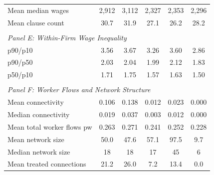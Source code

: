 \begin{table}[H]
\begin{threeparttable}
\begin{tabular}{lccccc}
Mean median wages & 2,912 & 3,112 & 2,327 & 2,353 & 2,296 \\
Mean clause count & 30.7 & 31.9 & 27.1 & 26.2 & 28.2 \\
&&&&& \\
\multicolumn{6}{l}{\textit{Panel E: Within-Firm Wage Inequality}} \\[0.5ex]
p90/p10 & 3.56 & 3.67 & 3.26 & 3.60 & 2.86 \\
p90/p50 & 2.03 & 2.04 & 1.99 & 2.12 & 1.83 \\
p50/p10 & 1.71 & 1.75 & 1.57 & 1.63 & 1.50 \\
&&&&& \\
\multicolumn{6}{l}{\textit{Panel F: Worker Flows and Network Structure}} \\[0.5ex]
Mean connectivity & 0.106 & 0.138 & 0.012 & 0.023 & 0.000 \\
Median connectivity & 0.019 & 0.037 & 0.003 & 0.012 & 0.000 \\
Mean total worker flows pw & 0.263 & 0.271 & 0.241 & 0.252 & 0.228 \\
Mean network size & 50.0 & 47.6 & 57.1 & 97.5 & 9.7 \\
Median network size & 18 & 18 & 17 & 45 & 6 \\
Mean treated connections & 21.2 & 26.0 & 7.2 & 13.4 & 0.0 \\
\bottomrule
\end{tabular}
\scriptsize
\begin{tablenotes}

\end{tablenotes}
\end{threeparttable}
\end{table}

